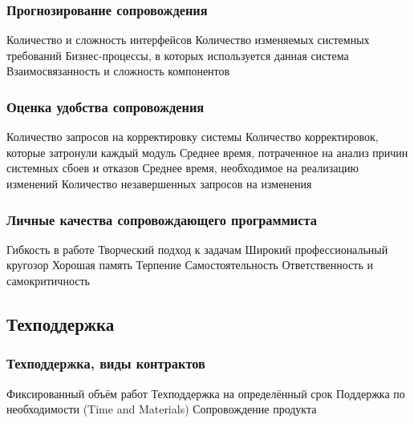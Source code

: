 \documentclass{../../slides-style}
\begin{document}
    \begin{frame}
        \frametitle{Прогнозирование сопровождения}
        \begin{outline}
            \1 Количество и сложность интерфейсов
            \1 Количество изменяемых системных требований
            \1 Бизнес-процессы, в которых используется данная система
            \1 Взаимосвязанность и сложность компонентов
        \end{outline}
    \end{frame}

    \begin{frame}
        \frametitle{Оценка удобства сопровождения}
        \begin{outline}
            \1 Количество запросов на корректировку системы
            \1 Количество корректировок, которые затронули каждый модуль
            \1 Среднее время, потраченное на анализ причин системных сбоев и отказов
            \1 Среднее время, необходимое на реализацию изменений
            \1 Количество незавершенных запросов на изменения
        \end{outline}
    \end{frame}

    \begin{frame}
        \frametitle{Личные качества сопровождающего программиста}
        \begin{outline}
            \1 Гибкость в работе
            \1 Творческий подход к задачам
            \1 Широкий профессиональный кругозор
            \1 Хорошая память
            \1 Терпение
            \1 Самостоятельность
            \1 Ответственность и самокритичность
        \end{outline}
    \end{frame}

    \subsection{Техподдержка}

    \begin{frame}
        \frametitle{Техподдержка, виды контрактов}
        \begin{outline}
            \1 Фиксированный объём работ
            \1 Техподдержка на определённый срок
            \1 Поддержка по необходимости (Time and Materials)
            \1 Сопровождение продукта
        \end{outline}
    \end{frame}
\end{document}
